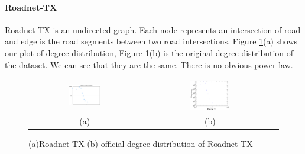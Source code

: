 \paragraph{Roadnet-TX}
Roadnet-TX is an undirected graph. Each node represents an intersection of road and edge is the road segments between two road intersections. Figure \ref{t1:tx}(a) shows our plot of degree distribution, Figure \ref{t1:tx}(b) is the original degree distribution of the dataset. We can see that they are the same. There is no obvious power law.
\begin{figure}[!htbf]
\begin{center}
\begin{tabular}{c c}
     \includegraphics[width=0.3\textwidth]{FIG/t1_tx.png} & 
     \includegraphics[width=0.3\textwidth]{FIG/t1_tx_truth.png}\\
    (a) & (b)\\
\end{tabular}
\caption{(a)Roadnet-TX (b) official degree distribution of Roadnet-TX}
\label{t1:tx}
\end{center}
\end{figure}

